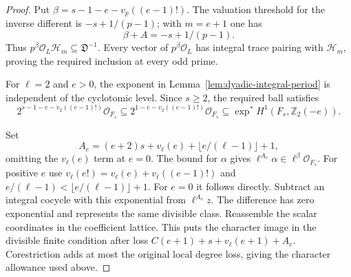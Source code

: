 \begin{proof}
Put \(\beta=s-1-e-v_p((e-1)!)\). The valuation threshold for the inverse different is \(-s+1/(p-1)\); with \(m=e+1\) one has
\[
        \beta+A=-s+1/(p-1).
\]
Thus \(p^\beta\mathcal O_L\mathcal H_m\subseteq\mathfrak D^{-1}\). Every vector of \(p^\beta\mathcal O_L\) has integral trace pairing with \(\mathcal H_m\), proving the required inclusion at every odd prime.

For \(\ell=2\) and \(e>0\), the exponent in Lemma~\ref{lem:dyadic-integral-period} is independent of the cyclotomic level. Since \(s\ge2\), the required ball satisfies
\[
  2^{s-1-e-v_2((e-1)!)}\mathcal O_{F_s}
     \subseteq 2^{1-e-v_2((e-1)!)}\mathcal O_{F_s}
     \subseteq\exp^* H^1(F_s,\mathbb Z_2(-e)).
\]
\label{cor:cyclotomic-character-lifting-3}

Set
\[
 A_e=(e+2)s+v_\ell(e)+\lfloor e/(\ell-1)\rfloor+1,
\]
omitting the \(v_\ell(e)\) term at \(e=0\).
The bound for \(\alpha\) gives
\(\ell^{A_e}\alpha\in\ell^\beta\mathcal O_{F_s}\).
For positive \(e\) use
\(v_\ell(e!)=v_\ell(e)+v_\ell((e-1)!)\) and
\(e/(\ell-1)<\lfloor e/(\ell-1)\rfloor+1\).
For \(e=0\) it follows directly.
Subtract an integral cocycle with this exponential
from \(\ell^{A_e}z\). The difference has zero
exponential and represents the same divisible
class. Reassemble the scalar coordinates in the
coefficient lattice. This puts the character image
in the divisible finite condition after loss
\(C(e+1)+s+v_\ell(e+1)+A_e\).
Corestriction adds at most the original local degree
loss, giving the character allowance used above.
\end{proof}

